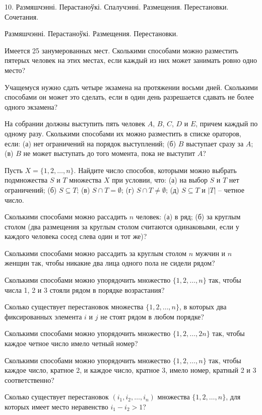 



\biLangHeader
{10. Размяшчэнні. Перастаноўкі. Спалучэнні.}
{Размещения. Перестановки. Сочетания.}

\biLangHeader
{Размяшчэнні. Перастаноўкі.}
{Размещения. Перестановки.}

\begin{problemList}

\problemItemSimple
{}
{Имеется 25 занумерованных мест. Сколькими способами можно разместить
пятерых человек на этих местах, если каждый из них может занимать
ровно одно место?}

\problemItemSimple
{}
{Учащемуся нужно сдать четыре экзамена на протяжении восьми дней.
Сколькими способами он может это сделать, если в один день разрешается
сдавать не более одного экзамена?}

\problemItemSimple
{}
{На собрании должны выступить пять человек $A$, $B$, $C$, $D$ и $E$,
причем каждый по одному разу. Сколькими способами их можно разместить
в списке ораторов, если: (а) нет ограничений на порядок выступлений;
(б) $B$ выступает сразу за $A$; (в) $B$ не может выступать до того
момента, пока не выступит $A$?}

\problemItemSimple
{}
{Пусть $X = \{1, 2, \ldots, n\}$. Найдите число способов, которыми
можно выбрать подмножества $S$ и $T$ множества $X$ при условии, что:
(а) на выбор $S$ и $T$ нет ограничений; (б) $S \subseteq T$; (в)
$S \cap T = \emptyset$; (г) $S \cap T \ne \emptyset$; (д)
$S \subseteq T$ и $|T|$ -- четное число.}

\problemItemSimple
{}
{Сколькими способами можно рассадить $n$ человек: (а) в ряд; (б) за
круглым столом (два размещения за круглым столом считаются
одинаковыми, если у каждого человека сосед слева один и тот же)?}

\problemItemSimple
{}
{Сколькими способами можно рассадить за круглым столом $n$ мужчин и
$n$ женщин так, чтобы никакие два лица одного пола не сидели рядом?}

\problemItemSimple
{}
{Сколькими способами можно упорядочить множество $\{1, 2, \ldots, n\}$
так, чтобы числа 1, 2 и 3 стояли рядом в порядке возрастания?}

\problemItemSimple
{}
{Сколько существует перестановок множества $\{1, 2, \ldots, n\}$, в
которых два фиксированных элемента $i$ и $j$ не стоят рядом в любом
порядке?}

\problemItemSimple
{}
{Сколькими способами можно упорядочить множество $\{1, 2, \ldots, 2n\}$
так, чтобы каждое четное число имело четный номер?}

\problemItemSimple
{}
{Сколькими способами можно упорядочить множество $\{1, 2, \ldots, n\}$
так, чтобы каждое число, кратное 2, и каждое число, кратное 3, имело
номер, кратный 2 и 3 соответственно?}

\problemItemSimple
{}
{Сколько существует перестановок $(i_1, i_2, \ldots, i_n)$ множества
$\{1, 2, \ldots, n\}$, для которых имеет место неравенство
$i_1 - i_2 > 1$?}

\end{problemList}


